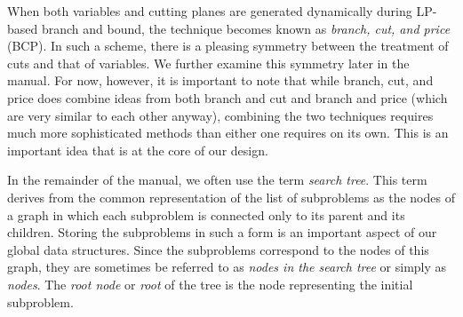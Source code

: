 When both variables and cutting planes are generated dynamically
during LP-based branch and bound, the technique becomes known as {\em
branch, cut, and price} (BCP). In such a scheme, there is a pleasing
symmetry between the treatment of cuts and that of variables. We
further examine this symmetry later in the manual. For
now, however, it is important to note that while branch, cut, and
price does combine ideas from both branch and cut and branch and price
(which are very similar to each other anyway), combining the two
techniques requires much more sophisticated methods than either one
requires on its own. This is an important idea that is at the core of
our design.

In the remainder of the manual, we often use the term {\em search
tree}. This term derives from the common representation of the list of
subproblems as the nodes of a graph in which each subproblem is
connected only to its parent and its children. Storing the subproblems
in such a form is an important aspect of our global data structures.
Since the subproblems correspond to the nodes of this graph, they are
sometimes be referred to as {\em nodes in the search tree} or simply
as {\em nodes}. The {\em root node} or {\em root} of the tree is the
node representing the initial subproblem.

